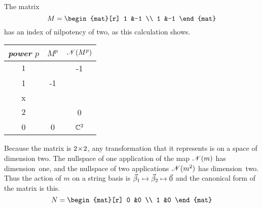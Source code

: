 \begin{example}
The matrix
\begin{equation*}
  M=\begin{mat}[r]
      1  &-1  \\
      1  &-1
    \end{mat}
\end{equation*}
has an index of nilpotency of two, as this calculation shows.
\begin{center}
  \begin{tabular}{c|cc}
    \multicolumn{1}{c}{\textit{power} \( p \)}  &\( M^p \)  &\( \mathscr{N}(M^p)  \)   \\  
    \hline
    \( 1 \)
    &\(  
       M=\matrixvenlarge{\begin{mat}[r]
         1  &-1  \\
         1  &-1
       \end{mat}}  \)
    &\( \set{\matrixvenlarge{\colvec{x \\ x}}\suchthat
                               x\in\C}  \)   \\
    \( 2 \)
    &\(  M^2=\matrixvenlarge{\begin{mat}[r]
         0  &0   \\
         0  &0
       \end{mat}}  \)
    &\( \mathbb{C}^2  \)
  \end{tabular}
\end{center}
Because the matrix is $2 \! \times \! 2$, any transformation that it represents 
is on a space of dimension two.
The nullspace of one application of the map 
$\mathscr{N}(m)$ has dimension~one, and
the nullspace of two applications $\mathscr{N}(m^2)$ has dimension~two.
Thus the action of $m$ on a string basis is
$\vec{\beta}_1\mapsto\vec{\beta}_2\mapsto\vec{0}$ 
and the canonical form of the matrix is this.
\begin{equation*}
  N=\begin{mat}[r]
    0  &0  \\
    1  &0
  \end{mat}
\end{equation*}


\end{example}
